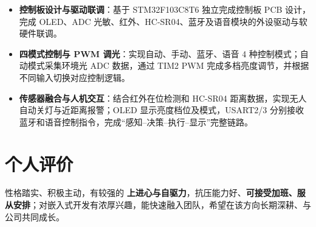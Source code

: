 \documentclass[10pt,a4paper]{article}
\begin{document}
\begin{itemize}[leftmargin=1.5em, itemsep=1pt, parsep=0pt, topsep=2pt]
    \item \textbf{控制板设计与驱动联调}：基于 STM32F103C8T6 独立完成控制板 PCB 设计，完成 OLED、ADC 光敏、红外、HC-SR04、蓝牙及语音模块的外设驱动与软硬件联调。
    \item \textbf{四模式控制与 PWM 调光}：实现自动、手动、蓝牙、语音 4 种控制模式；自动模式采集环境光 ADC 数据，通过 TIM2 PWM 完成多档亮度调节，并根据不同输入切换对应控制逻辑。
    \item \textbf{传感器融合与人机交互}：结合红外在位检测和 HC-SR04 距离数据，实现无人自动关灯与近距离报警；OLED 显示亮度档位及模式，USART2/3 分别接收蓝牙和语音控制指令，完成“感知--决策--执行--显示”完整链路。
\end{itemize}

\vspace{0.15em}

\section{\faUser\hspace{0.4em}个人评价}

性格踏实、积极主动，有较强的 \textbf{上进心与自驱力}，抗压能力好、\textbf{可接受加班、服从安排}；对嵌入式开发有浓厚兴趣，能快速融入团队，希望在该方向长期深耕、与公司共同成长。
\end{document}
